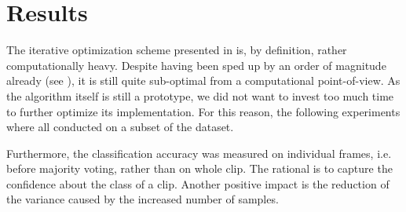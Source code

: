 






\chapter{Results} \label{chap:results}

The iterative optimization scheme presented in  is, by definition, rather computationally heavy. Despite having been sped up by an order of magnitude already (see ), it is still quite sub-optimal from a computational point-of-view. As the algorithm itself is still a prototype, we did not want to invest too much time to further optimize its implementation. For this reason, the following experiments where all conducted on a subset of the dataset.

Furthermore, the classification accuracy was measured on individual frames, i.e. before majority voting, rather than on whole clip. The rational is to capture the confidence about the class of a clip. Another positive impact is the reduction of the variance caused by the increased number of samples.

